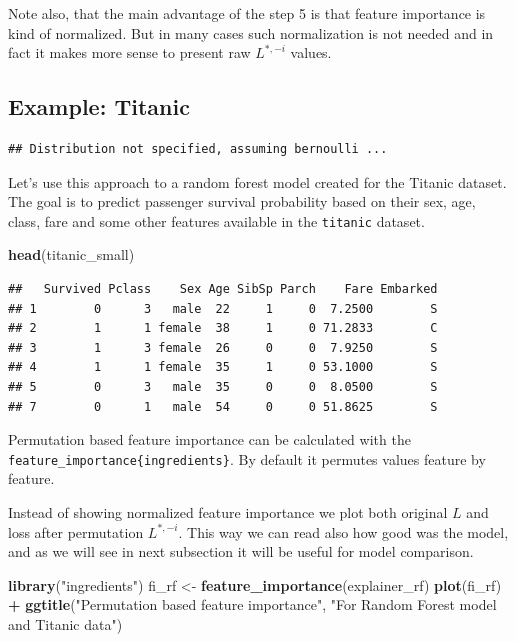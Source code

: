 \documentclass[]{krantz}
\newenvironment{Shaded}{\begin{snugshade}}{\end{snugshade}}
\newcommand{\KeywordTok}[1]{\textcolor[rgb]{0.13,0.29,0.53}{\textbf{#1}}}
\newcommand{\NormalTok}[1]{#1}
\newcommand{\OperatorTok}[1]{\textcolor[rgb]{0.81,0.36,0.00}{\textbf{#1}}}
\newcommand{\StringTok}[1]{\textcolor[rgb]{0.31,0.60,0.02}{#1}}
\theoremstyle{definition}
\theoremstyle{definition}
\theoremstyle{definition}
\theoremstyle{remark}
\begin{document}
Note also, that the main advantage of the step 5 is that feature
importance is kind of normalized. But in many cases such normalization
is not needed and in fact it makes more sense to present raw
\(L^{*,-i}\) values.

\hypertarget{example-titanic}{%
\subsection{Example: Titanic}\label{example-titanic}}

\begin{verbatim}
## Distribution not specified, assuming bernoulli ...
\end{verbatim}

Let's use this approach to a random forest model created for the Titanic
dataset. The goal is to predict passenger survival probability based on
their sex, age, class, fare and some other features available in the
\texttt{titanic} dataset.

\begin{Shaded}
\begin{Highlighting}[]
\KeywordTok{head}\NormalTok{(titanic_small)}
\end{Highlighting}
\end{Shaded}

\begin{verbatim}
##   Survived Pclass    Sex Age SibSp Parch    Fare Embarked
## 1        0      3   male  22     1     0  7.2500        S
## 2        1      1 female  38     1     0 71.2833        C
## 3        1      3 female  26     0     0  7.9250        S
## 4        1      1 female  35     1     0 53.1000        S
## 5        0      3   male  35     0     0  8.0500        S
## 7        0      1   male  54     0     0 51.8625        S
\end{verbatim}

Permutation based feature importance can be calculated with the
\texttt{feature\_importance\{ingredients\}}. By default it permutes
values feature by feature.

Instead of showing normalized feature importance we plot both original
\(L\) and loss after permutation \(L^{*,-i}\). This way we can read also
how good was the model, and as we will see in next subsection it will be
useful for model comparison.

\begin{Shaded}
\begin{Highlighting}[]
\KeywordTok{library}\NormalTok{(}\StringTok{"ingredients"}\NormalTok{)}
\NormalTok{fi_rf <-}\StringTok{ }\KeywordTok{feature_importance}\NormalTok{(explainer_rf) }
\KeywordTok{plot}\NormalTok{(fi_rf) }\OperatorTok{+}\StringTok{ }\KeywordTok{ggtitle}\NormalTok{(}\StringTok{"Permutation based feature importance"}\NormalTok{, }\StringTok{"For Random Forest model and Titanic data"}\NormalTok{)}
\end{Highlighting}
\end{Shaded}
\end{document}
